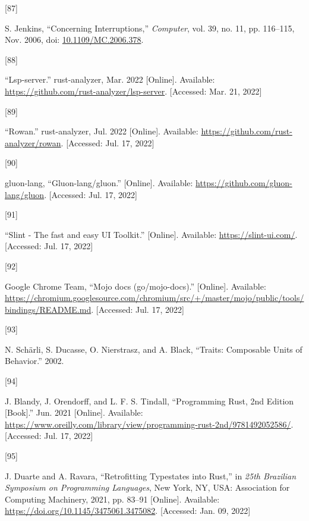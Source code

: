 \documentclass[
  a4paper,
  bibtex,
  english,
  nomenclature]{kthlatex/kththesis/kththesis}
\newlength{\cslhangindent}
\newlength{\csllabelwidth}
\newlength{\cslentryspacingunit} %
\newenvironment{CSLReferences}[2] %
 {%
  \setlength{\parindent}{0pt}
  \ifodd #1
  \let\oldpar\par
  \def\par{\hangindent=\cslhangindent\oldpar}
  \fi
  \setlength{\parskip}{#2\cslentryspacingunit}
 }%
 {}
\newcommand{\CSLLeftMargin}[1]{\parbox[t]{\csllabelwidth}{#1}}
\newcommand{\CSLRightInline}[1]{\parbox[t]{\linewidth - \csllabelwidth}{#1}\break}
\begin{document}
\begin{CSLReferences}{0}{0}
\leavevmode{}%
\CSLLeftMargin{{[}87{]} }
\CSLRightInline{S. Jenkins, {``Concerning {Interruptions},''}
\emph{Computer}, vol. 39, no. 11, pp. 116--115, Nov. 2006, doi:
\href{https://doi.org/10.1109/MC.2006.378}{10.1109/MC.2006.378}. }

\leavevmode{}%
\CSLLeftMargin{{[}88{]} }
\CSLRightInline{{``Lsp-server.''} rust-analyzer, Mar. 2022 {[}Online{]}.
Available: \url{https://github.com/rust-analyzer/lsp-server}.
{[}Accessed: Mar. 21, 2022{]}}

\leavevmode{}%
\CSLLeftMargin{{[}89{]} }
\CSLRightInline{{``Rowan.''} rust-analyzer, Jul. 2022 {[}Online{]}.
Available: \url{https://github.com/rust-analyzer/rowan}. {[}Accessed:
Jul. 17, 2022{]}}

\leavevmode{}%
\CSLLeftMargin{{[}90{]} }
\CSLRightInline{gluon-lang, {``Gluon-lang/gluon.''} {[}Online{]}.
Available: \url{https://github.com/gluon-lang/gluon}. {[}Accessed: Jul.
17, 2022{]}}

\leavevmode{}%
\CSLLeftMargin{{[}91{]} }
\CSLRightInline{{``Slint - {The} fast and easy {UI Toolkit}.''}
{[}Online{]}. Available: \url{https://slint-ui.com/}. {[}Accessed: Jul.
17, 2022{]}}

\leavevmode{}%
\CSLLeftMargin{{[}92{]} }
\CSLRightInline{Google Chrome Team, {``Mojo docs (go/mojo-docs).''}
{[}Online{]}. Available:
\url{https://chromium.googlesource.com/chromium/src/+/master/mojo/public/tools/bindings/README.md}.
{[}Accessed: Jul. 17, 2022{]}}

\leavevmode{}%
\CSLLeftMargin{{[}93{]} }
\CSLRightInline{N. Schärli, S. Ducasse, O. Nierstrasz, and A. Black,
{``Traits: {Composable Units} of {Behavior}.''} 2002. }

\leavevmode{}%
\CSLLeftMargin{{[}94{]} }
\CSLRightInline{J. Blandy, J. Orendorff, and L. F. S. Tindall,
{``Programming {Rust}, 2nd {Edition} {[}{Book}{]}.''} Jun. 2021
{[}Online{]}. Available:
\url{https://www.oreilly.com/library/view/programming-rust-2nd/9781492052586/}.
{[}Accessed: Jul. 17, 2022{]}}

\leavevmode{}%
\CSLLeftMargin{{[}95{]} }
\CSLRightInline{J. Duarte and A. Ravara, {``Retrofitting {Typestates}
into {Rust},''} in \emph{25th {Brazilian Symposium} on {Programming
Languages}}, {New York, NY, USA}: {Association for Computing Machinery},
2021, pp. 83--91 {[}Online{]}. Available:
\url{https://doi.org/10.1145/3475061.3475082}. {[}Accessed: Jan. 09,
2022{]}}


\end{CSLReferences}
\end{document}
